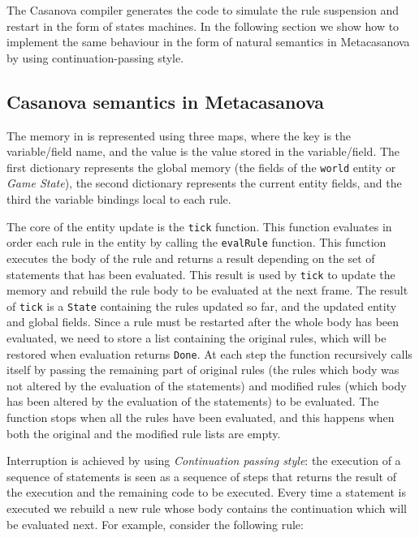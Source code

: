 The Casanova compiler generates the code to simulate the rule suspension and restart in the form of states machines. In the following section we show how to implement the same behaviour in the form of natural semantics in Metacasanova by using continuation-passing style.

\subsection{Casanova semantics in Metacasanova}
\label{subsec:ch_mcnv_languages_casanova_semantics}
The memory in  is represented using three maps, where the key is the variable/field name, and the value is the value stored in the variable/field. The first dictionary represents the global memory (the fields of the \texttt{world} entity or \textit{Game State}), the second dictionary represents the current entity fields, and the third the variable bindings local to each rule.

The core of the entity update is the \texttt{tick} function. This function evaluates in order each rule in the entity by calling the \texttt{evalRule} function. This function executes the body of the rule and returns a result depending on the set of statements that has been evaluated. This result is used by \texttt{tick} to update the memory and rebuild the rule body to be evaluated at the next frame. The result of \texttt{tick} is a \texttt{State} containing the rules updated so far, and the updated entity and global fields. Since a rule must be restarted after the whole body has been evaluated, we need to store a list containing the original rules, which will be restored when evaluation returns \texttt{Done}. At each step the function recursively calls itself by passing the remaining part of original rules (the rules which body was not altered by the evaluation of the statements) and modified rules (which body has been altered by the evaluation of the statements) to be evaluated. The function stops when all the rules have been evaluated, and this happens when both the original and the modified rule lists are empty.

Interruption is achieved by using \textit{Continuation passing style}: the execution of a sequence of statements is seen as a sequence of steps that returns the result of the execution and the remaining code to be executed. Every time a statement is executed we rebuild a new rule whose body contains the continuation which will be evaluated next. For example, consider the following rule:

